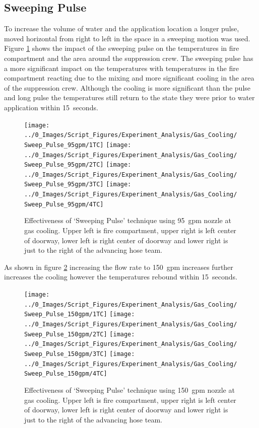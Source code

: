 \documentclass[12pt,oneside]{book}
\begin{document}
\subsection {Sweeping Pulse}
To increase the volume of water and the application location a longer pulse, moved horizontal from right to left in the space in a sweeping motion was used. Figure \ref{fig:gas_sweep_pulse_95} shows the impact of the sweeping pulse on the temperatures in fire compartment and the area around the suppression crew. The sweeping pulse has a more significant impact on the temperatures with temperatures in the fire compartment reacting due to the mixing and more significant cooling in the area of the suppression crew. Although the cooling is more significant than the pulse and long pulse the temperatures still return to the state they were prior to water application within 15~seconds.

\begin{figure}[H]
\centering
\texttt{[image: ../0\_Images/Script\_Figures/Experiment\_Analysis/Gas\_Cooling/Sweep\_Pulse\_95gpm/1TC]}
\texttt{[image: ../0\_Images/Script\_Figures/Experiment\_Analysis/Gas\_Cooling/Sweep\_Pulse\_95gpm/2TC]}
\texttt{[image: ../0\_Images/Script\_Figures/Experiment\_Analysis/Gas\_Cooling/Sweep\_Pulse\_95gpm/3TC]}
\texttt{[image: ../0\_Images/Script\_Figures/Experiment\_Analysis/Gas\_Cooling/Sweep\_Pulse\_95gpm/4TC]}
\caption[Gas Cooling - Sweeping Pulse 95~gpm]{Effectiveness of `Sweeping Pulse' technique using 95~gpm nozzle at gas cooling. Upper left is fire compartment, upper right is left center of doorway, lower left is right center of doorway and lower right is just to the right of the advancing hose team.}
\label{fig:gas_sweep_pulse_95}
\end{figure}

As shown in figure \ref{fig:gas_sweep_pulse_150} increasing the flow rate to 150~gpm increases further increases the cooling however the temperatures rebound within 15~seconds. 

\begin{figure}[H]
\centering
\texttt{[image: ../0\_Images/Script\_Figures/Experiment\_Analysis/Gas\_Cooling/Sweep\_Pulse\_150gpm/1TC]}
\texttt{[image: ../0\_Images/Script\_Figures/Experiment\_Analysis/Gas\_Cooling/Sweep\_Pulse\_150gpm/2TC]}
\texttt{[image: ../0\_Images/Script\_Figures/Experiment\_Analysis/Gas\_Cooling/Sweep\_Pulse\_150gpm/3TC]}
\texttt{[image: ../0\_Images/Script\_Figures/Experiment\_Analysis/Gas\_Cooling/Sweep\_Pulse\_150gpm/4TC]}
\caption[Gas Cooling - Sweeping Pulse 150~gpm]{Effectiveness of `Sweeping Pulse' technique using 150~gpm nozzle at gas cooling. Upper left is fire compartment, upper right is left center of doorway, lower left is right center of doorway and lower right is just to the right of the advancing hose team.}
\label{fig:gas_sweep_pulse_150}
\end{figure}
\end{document}
